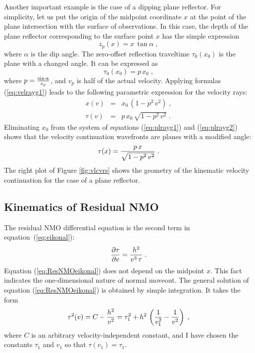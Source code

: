 Another important example is the case of a dipping plane reflector. For
simplicity, let us put the origin of the midpoint coordinate $x$ at the point
of the plane intersection with the surface of observations. In this case, the
depth of the plane reflector corresponding to the surface point $x$ has the
simple expression
\begin{equation}
z_p(x) = x\,\tan{\alpha}\;,
\label{eq:plane}
\end{equation}
where $\alpha$ is the dip angle. The zero-offset reflection traveltime
$\tau_0(x_0)$ 
is the plane with a changed angle. It can be expressed as
\begin{equation}
\tau_0(x_0) = p\,x_0\;,
\label{eq:plt0}
\end{equation}
where $p = {{\sin{\alpha}}\over v_p}$, and $v_p$ is half of the actual
velocity. Applying formulas (\ref{eq:velrayg1}) leads to the following
parametric expression for the velocity rays:
\begin{eqnarray}
x(v) & = & x_0\,(1 -  p^2\,v^2)\;,
\label{eq:plrayg1} \\ 
\tau(v) & = & p\,x_0\,\sqrt{1 -  p^2\,v^2}\;.
\label{eq:plrayg2} 
\end{eqnarray}
Eliminating $x_0$ from the system of equations (\ref{eq:plrayg1}) and
(\ref{eq:plrayg2}) shows that the velocity continuation wavefronts are
planes with a modified angle:
\begin{equation}
\tau(x)={{p\,x} \over {\sqrt{1 -  p^2\,v^2}}}\;.
\label{eq:plfront}
\end{equation}
The right plot of Figure \ref{fig:vlcvrs} shows the geometry of the
kinematic velocity continuation for the case of a plane reflector.

\subsection{Kinematics of Residual NMO}
The residual NMO differential equation is the second term in
equation~(\ref{eq:eikonal}):
\begin{equation}
{{\partial \tau} \over {\partial v}} = 
{{h^2} \over {v^3\,\tau}}\;.
\label{eq:ResNMOeikonal} 
\end{equation}
Equation (\ref{eq:ResNMOeikonal}) does not depend on the midpoint
$x$. This fact indicates the one-dimensional nature of normal
moveout. The general solution of equation (\ref{eq:ResNMOeikonal}) is
obtained by simple integration. It takes the form
\begin{equation}
\tau^2(v) = C - {h^2 \over v^2} = \tau_1^2 + 
h^2\,\left({1 \over v_1^2} - {1 \over v^2}\right)\;,
\label{eq:ResNMO} 
\end{equation}
where $C$ is an arbitrary velocity-independent constant, and I have chosen the
constants $\tau_1$ and $v_1$ so that $\tau(v_1) = \tau_1$.

